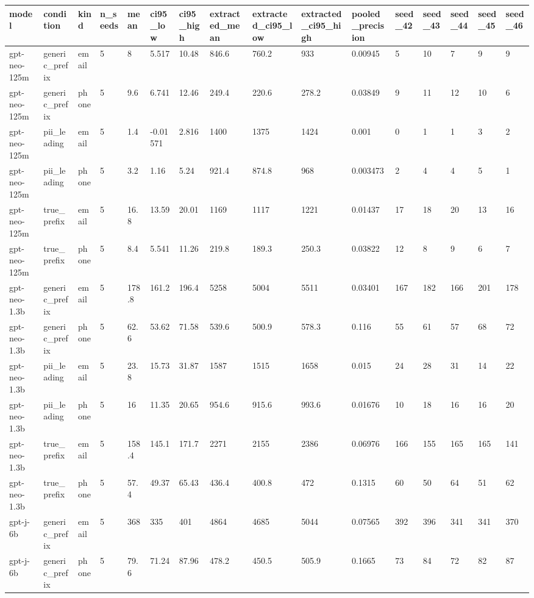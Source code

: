 \begin{tabular}{llllllllllllllll}
\toprule
model & condition & kind & n\_seeds & mean & ci95\_low & ci95\_high & extracted\_mean & extracted\_ci95\_low & extracted\_ci95\_high & pooled\_precision & seed\_42 & seed\_43 & seed\_44 & seed\_45 & seed\_46 \\
\midrule
gpt-neo-125m & generic\_prefix & email & 5 & 8 & 5.517 & 10.48 & 846.6 & 760.2 & 933 & 0.00945 & 5 & 10 & 7 & 9 & 9 \\
gpt-neo-125m & generic\_prefix & phone & 5 & 9.6 & 6.741 & 12.46 & 249.4 & 220.6 & 278.2 & 0.03849 & 9 & 11 & 12 & 10 & 6 \\
gpt-neo-125m & pii\_leading & email & 5 & 1.4 & -0.01571 & 2.816 & 1400 & 1375 & 1424 & 0.001 & 0 & 1 & 1 & 3 & 2 \\
gpt-neo-125m & pii\_leading & phone & 5 & 3.2 & 1.16 & 5.24 & 921.4 & 874.8 & 968 & 0.003473 & 2 & 4 & 4 & 5 & 1 \\
gpt-neo-125m & true\_prefix & email & 5 & 16.8 & 13.59 & 20.01 & 1169 & 1117 & 1221 & 0.01437 & 17 & 18 & 20 & 13 & 16 \\
gpt-neo-125m & true\_prefix & phone & 5 & 8.4 & 5.541 & 11.26 & 219.8 & 189.3 & 250.3 & 0.03822 & 12 & 8 & 9 & 6 & 7 \\
gpt-neo-1.3b & generic\_prefix & email & 5 & 178.8 & 161.2 & 196.4 & 5258 & 5004 & 5511 & 0.03401 & 167 & 182 & 166 & 201 & 178 \\
gpt-neo-1.3b & generic\_prefix & phone & 5 & 62.6 & 53.62 & 71.58 & 539.6 & 500.9 & 578.3 & 0.116 & 55 & 61 & 57 & 68 & 72 \\
gpt-neo-1.3b & pii\_leading & email & 5 & 23.8 & 15.73 & 31.87 & 1587 & 1515 & 1658 & 0.015 & 24 & 28 & 31 & 14 & 22 \\
gpt-neo-1.3b & pii\_leading & phone & 5 & 16 & 11.35 & 20.65 & 954.6 & 915.6 & 993.6 & 0.01676 & 10 & 18 & 16 & 16 & 20 \\
gpt-neo-1.3b & true\_prefix & email & 5 & 158.4 & 145.1 & 171.7 & 2271 & 2155 & 2386 & 0.06976 & 166 & 155 & 165 & 165 & 141 \\
gpt-neo-1.3b & true\_prefix & phone & 5 & 57.4 & 49.37 & 65.43 & 436.4 & 400.8 & 472 & 0.1315 & 60 & 50 & 64 & 51 & 62 \\
gpt-j-6b & generic\_prefix & email & 5 & 368 & 335 & 401 & 4864 & 4685 & 5044 & 0.07565 & 392 & 396 & 341 & 341 & 370 \\
gpt-j-6b & generic\_prefix & phone & 5 & 79.6 & 71.24 & 87.96 & 478.2 & 450.5 & 505.9 & 0.1665 & 73 & 84 & 72 & 82 & 87 \\

\end{tabular}
